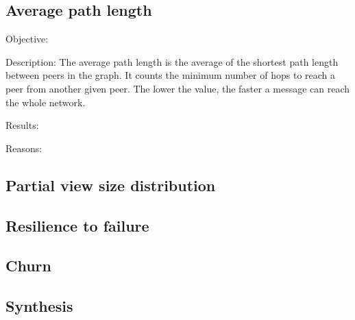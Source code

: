 \subsection{Average path length}
\begin{asparadesc}
\item[Objective:]
\item[Description:] The average path length is the average of the shortest path
  length between peers in the graph. It counts the minimum number of hops to
  reach a peer from another given peer. The lower the value, the faster a
  message can reach the whole network.
\item[Results:]
\item[Reasons:]
\end{asparadesc}


\subsection{Partial view size distribution}

\subsection{Resilience to failure}

\subsection{Churn}

\subsection{Synthesis}

